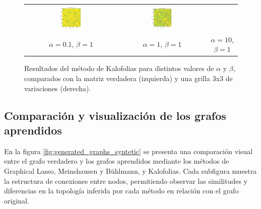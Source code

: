 \documentclass{article}
\begin{document}
\begin{figure}[htb]
\begin{minipage}[t]{0.72\textwidth}
\begin{tabular}{ccc}
            \includegraphics[width=0.28\textwidth]{imagenes/kalofolias/kalofolias_alpha1_beta1.pdf} &
            \includegraphics[width=0.28\textwidth]{imagenes/kalofolias/kalofolias_alpha10_beta1.pdf} \\
            $\alpha=0.1$, $\beta=1$ & $\alpha=1$, $\beta=1$ & $\alpha=10$, $\beta=1$ \\
        \end{tabular}
    \end{minipage}
    \caption{Resultados del método de Kalofolias para distintos valores de $\alpha$ y $\beta$, comparados con la matriz verdadera (izquierda) y una grilla 3x3 de variaciones (derecha).}
    \label{fig:kalofolias_grid}
\end{figure}


\subsection{Comparación y visualización de los grafos aprendidos}

En la figura \ref{fig:generated_graphs_syntetic} se presenta una comparación visual entre el grafo verdadero y los grafos aprendidos mediante los métodos de Graphical Lasso, Meinshausen y Bühlmann, y Kalofolias. Cada subfigura muestra la estructura de conexiones entre nodos, permitiendo observar las similitudes y diferencias en la topología inferida por cada método en relación con el grafo original.
\end{document}
